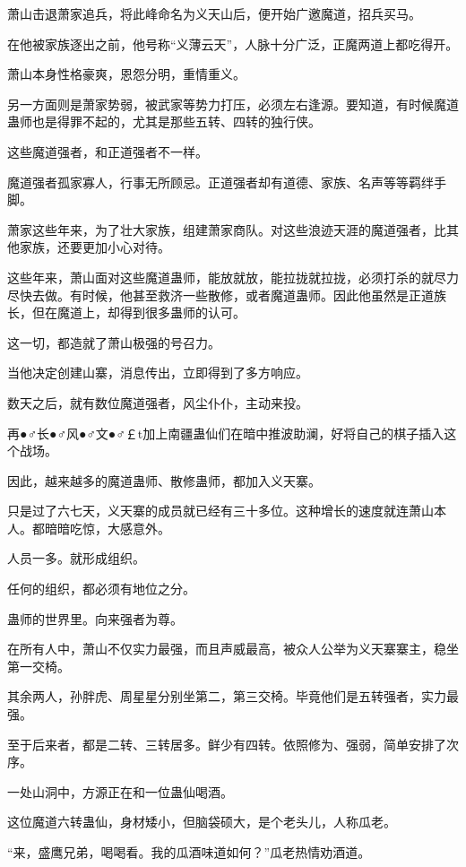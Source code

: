 
\begin{this_body}

萧山击退萧家追兵，将此峰命名为义天山后，便开始广邀魔道，招兵买马。

在他被家族逐出之前，他号称“义薄云天”，人脉十分广泛，正魔两道上都吃得开。

萧山本身性格豪爽，恩怨分明，重情重义。

另一方面则是萧家势弱，被武家等势力打压，必须左右逢源。要知道，有时候魔道蛊师也是得罪不起的，尤其是那些五转、四转的独行侠。

这些魔道强者，和正道强者不一样。

魔道强者孤家寡人，行事无所顾忌。正道强者却有道德、家族、名声等等羁绊手脚。

萧家这些年来，为了壮大家族，组建萧家商队。对这些浪迹天涯的魔道强者，比其他家族，还要更加小心对待。

这些年来，萧山面对这些魔道蛊师，能放就放，能拉拢就拉拢，必须打杀的就尽力尽快去做。有时候，他甚至救济一些散修，或者魔道蛊师。因此他虽然是正道族长，但在魔道上，却得到很多蛊师的认可。

这一切，都造就了萧山极强的号召力。

当他决定创建山寨，消息传出，立即得到了多方响应。

数天之后，就有数位魔道强者，风尘仆仆，主动来投。

再●♂长●♂风●♂文●♂￡t加上南疆蛊仙们在暗中推波助澜，好将自己的棋子插入这个战场。

因此，越来越多的魔道蛊师、散修蛊师，都加入义天寨。

只是过了六七天，义天寨的成员就已经有三十多位。这种增长的速度就连萧山本人。都暗暗吃惊，大感意外。

人员一多。就形成组织。

任何的组织，都必须有地位之分。

蛊师的世界里。向来强者为尊。

在所有人中，萧山不仅实力最强，而且声威最高，被众人公举为义天寨寨主，稳坐第一交椅。

其余两人，孙胖虎、周星星分别坐第二，第三交椅。毕竟他们是五转强者，实力最强。

至于后来者，都是二转、三转居多。鲜少有四转。依照修为、强弱，简单安排了次序。

一处山洞中，方源正在和一位蛊仙喝酒。

这位魔道六转蛊仙，身材矮小，但脑袋硕大，是个老头儿，人称瓜老。

“来，盛鹰兄弟，喝喝看。我的瓜酒味道如何？”瓜老热情劝酒道。


\end{this_body}
